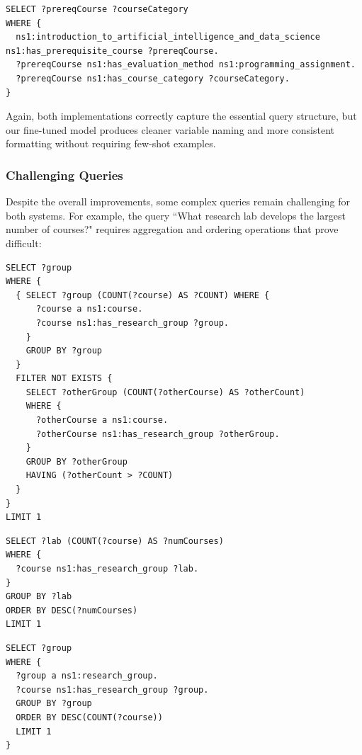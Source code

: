 \begin{lstlisting}[language=SPARQL, caption=FrOG Output for Course Category, label=code:curriculum-category-previous]
SELECT ?prereqCourse ?courseCategory
WHERE {
  ns1:introduction_to_artificial_intelligence_and_data_science ns1:has_prerequisite_course ?prereqCourse.
  ?prereqCourse ns1:has_evaluation_method ns1:programming_assignment.
  ?prereqCourse ns1:has_course_category ?courseCategory.
}
\end{lstlisting}

Again, both implementations correctly capture the essential query structure, but our fine-tuned model produces cleaner variable naming and more consistent formatting without requiring few-shot examples.

\subsubsection{Challenging Queries}
Despite the overall improvements, some complex queries remain challenging for both systems. For example, the query ``What research lab develops the largest number of courses?" requires aggregation and ordering operations that prove difficult:

\begin{lstlisting}[language=SPARQL, caption=Ground Truth Query for Research Lab with Most Courses, label=code:curriculum-lab-true]
SELECT ?group
WHERE {
  { SELECT ?group (COUNT(?course) AS ?COUNT) WHERE {
      ?course a ns1:course.
      ?course ns1:has_research_group ?group.
    } 
    GROUP BY ?group 
  }
  FILTER NOT EXISTS { 
    SELECT ?otherGroup (COUNT(?otherCourse) AS ?otherCount) 
    WHERE {
      ?otherCourse a ns1:course.
      ?otherCourse ns1:has_research_group ?otherGroup.
    } 
    GROUP BY ?otherGroup 
    HAVING (?otherCount > ?COUNT) 
  }
}
LIMIT 1
\end{lstlisting}

\begin{lstlisting}[language=SPARQL, caption=Our Base Model Output for Research Lab with Most Courses, label=code:curriculum-lab-base]
SELECT ?lab (COUNT(?course) AS ?numCourses)
WHERE {
  ?course ns1:has_research_group ?lab.
}
GROUP BY ?lab
ORDER BY DESC(?numCourses)
LIMIT 1
\end{lstlisting}

\begin{lstlisting}[language=SPARQL, caption=Our Template Fine-tuned Model Output for Research Lab with Most Courses, label=code:curriculum-lab-template]
SELECT ?group
WHERE {
  ?group a ns1:research_group.
  ?course ns1:has_research_group ?group.
  GROUP BY ?group
  ORDER BY DESC(COUNT(?course))
  LIMIT 1
}
\end{lstlisting}

